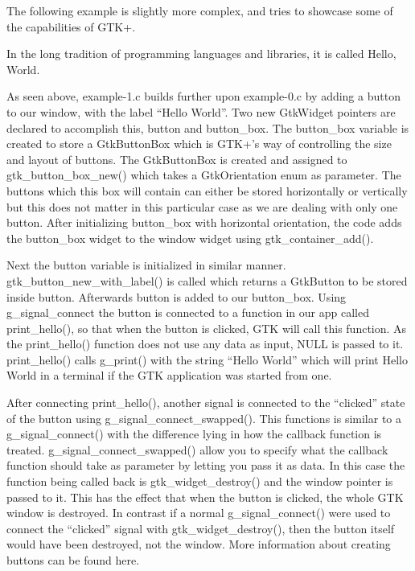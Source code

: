 \documentclass[a4paper,openany,twoside,draft]{book}
\begin{document}
The following example is slightly more complex, and tries to showcase some of the capabilities of GTK+.

In the long tradition of programming languages and libraries, it is called Hello, World.

As seen above, example-1.c builds further upon example-0.c by adding a button to our window, with the label ``Hello World''. Two new GtkWidget pointers are declared to accomplish this, button and button\_box. The button\_box variable is created to store a GtkButtonBox which is GTK+'s way of controlling the size and layout of buttons. The GtkButtonBox is created and assigned to gtk\_button\_box\_new() which takes a GtkOrientation enum as parameter. The buttons which this box will contain can either be stored horizontally or vertically but this does not matter in this particular case as we are dealing with only one button. After initializing button\_box with horizontal orientation, the code adds the button\_box widget to the window widget using gtk\_container\_add().

Next the button variable is initialized in similar manner. gtk\_button\_new\_with\_label() is called which returns a GtkButton to be stored inside button. Afterwards button is added to our button\_box. Using g\_signal\_connect the button is connected to a function in our app called print\_hello(), so that when the button is clicked, GTK will call this function. As the print\_hello() function does not use any data as input, NULL is passed to it. print\_hello() calls g\_print() with the string ``Hello World'' which will print Hello World in a terminal if the GTK application was started from one.

After connecting print\_hello(), another signal is connected to the ``clicked'' state of the button using g\_signal\_connect\_swapped(). This functions is similar to a g\_signal\_connect() with the difference lying in how the callback function is treated. g\_signal\_connect\_swapped() allow you to specify what the callback function should take as parameter by letting you pass it as data. In this case the function being called back is gtk\_widget\_destroy() and the window pointer is passed to it. This has the effect that when the button is clicked, the whole GTK window is destroyed. In contrast if a normal g\_signal\_connect() were used to connect the ``clicked'' signal with gtk\_widget\_destroy(), then the button itself would have been destroyed, not the window. More information about creating buttons can be found here.
\end{document}
